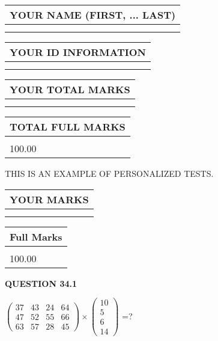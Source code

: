 \documentclass[12pt]{article}
\begin{document}
   
   
   
\noindent\begin{tabular}{|l|}
\hline
YOUR NAME (FIRST, ... LAST)  \\
\hline
 \\ 
 \\ 
\hline
\end{tabular}
\hspace{0.05in} \begin{tabular}{|l|}
\hline
 YOUR   ID   INFORMATION  \\
\hline
 \\ 
 \\ 
\hline
\end{tabular}
   
   
\vspace{0.2in}\noindent\begin{tabular}{|l|}
\hline
YOUR TOTAL MARKS  \\
\hline
 \\ 
 \\ 
\hline
\end{tabular}
\hspace{0.05in} \begin{tabular}{|l|}
\hline
TOTAL FULL MARKS  \\
\hline
 \\ 
100.00 \\
\hline
\end{tabular}
   
   
 \vspace{0.2in}
{\Huge  THIS IS AN EXAMPLE OF}
{\Huge  PERSONALIZED TESTS. }
   
   
  
\vspace{0.2in}
  
\noindent\begin{tabular}{|l|}
\hline
 YOUR MARKS  \\
\hline
 \\ 
 \\ 
\hline
\end{tabular}
\hspace{0.05in} \begin{tabular}{|l|}
\hline
 Full Marks  \\
\hline
 \\ 
100.00 \\
\hline
\end{tabular}
{\textbf{\Large{QUESTION
34.1 
}}}
  
  
 
$ \left( \begin{array}{ccccccccc}
          37  & 
          43  & 
          24  & 
          64  \\ 
          47  & 
          52  & 
          55  & 
          66  \\ 
          63  & 
          57  & 
          28  & 
          45
\end{array}\right) \times
\left( \begin{array}{c}
          10  \\ 
           5  \\ 
           6  \\ 
          14
\end{array}\right) $ =?
 
\end{document}
